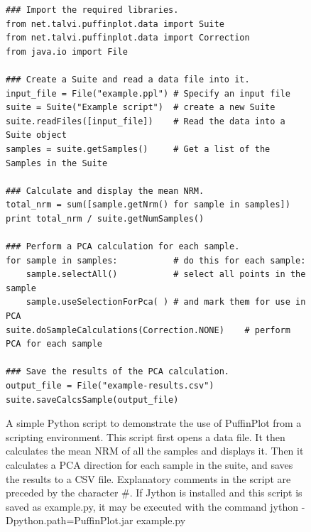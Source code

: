 \documentclass[a4paper,british]{article}
\newcommand{\ppcmd}[1]{\textsf{#1}} %
\newcommand{\caps}[1]{\MakeTextUppercase{#1}} %
\begin{document}
\begin{figure}
  \caption{\label{fig:script-example-1}A simple Python script to demonstrate
    the use of PuffinPlot from a scripting environment. This script first
    opens a data file. It then calculates the mean \caps{nrm} of all the
    samples and displays it. Then it calculates a \caps{pca} direction for
    each sample in the suite, and saves the results to a \caps{csv} file.
    Explanatory comments in the script are preceded by the character \#. If
    Jython is installed and this script is saved as \ppcmd{example.py}, it
    may be executed with the command \ppcmd{jython
      -Dpython.path=PuffinPlot.jar example.py}}
  \lstset{language=Python}
\begin{lstlisting}
### Import the required libraries.
from net.talvi.puffinplot.data import Suite
from net.talvi.puffinplot.data import Correction
from java.io import File

### Create a Suite and read a data file into it.
input_file = File("example.ppl") # Specify an input file
suite = Suite("Example script")  # create a new Suite
suite.readFiles([input_file])    # Read the data into a Suite object
samples = suite.getSamples()     # Get a list of the Samples in the Suite

### Calculate and display the mean NRM.
total_nrm = sum([sample.getNrm() for sample in samples])
print total_nrm / suite.getNumSamples()

### Perform a PCA calculation for each sample.
for sample in samples:           # do this for each sample:
    sample.selectAll()           # select all points in the sample
    sample.useSelectionForPca( ) # and mark them for use in PCA
suite.doSampleCalculations(Correction.NONE)    # perform PCA for each sample

### Save the results of the PCA calculation.
output_file = File("example-results.csv")
suite.saveCalcsSample(output_file)
\end{lstlisting}
\end{figure}
\end{document}
